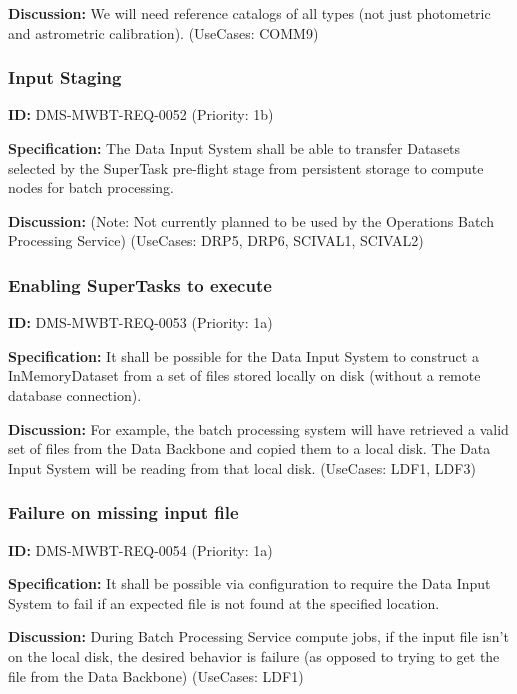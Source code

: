 \documentclass[SE,toc,lsstdraft]{lsstdoc}
\begin{document}
\textbf{Discussion:}
We will need reference catalogs of all types (not just photometric and astrometric calibration). (UseCases: COMM9)

\subsubsection{Input Staging}

\label{DMS-MWBT-REQ-0052}
\textbf{ID:} DMS-MWBT-REQ-0052 (Priority: 1b)

\textbf{Specification:}
The Data Input System shall be able to transfer Datasets selected by the SuperTask pre-flight stage from persistent storage to compute nodes for batch processing.

\textbf{Discussion:}
(Note: Not currently planned to be used by the Operations Batch Processing Service) (UseCases: DRP5, DRP6, SCIVAL1, SCIVAL2)

\subsubsection{Enabling SuperTasks to execute}

\label{DMS-MWBT-REQ-0053}
\textbf{ID:} DMS-MWBT-REQ-0053 (Priority: 1a)

\textbf{Specification:}
It shall be possible for the Data Input System to construct a InMemoryDataset from a set of files stored locally on disk (without a remote database connection).

\textbf{Discussion:}
For example, the batch processing system will have retrieved a valid set of files from the Data Backbone and copied them to a local disk. The Data Input System will be reading from that local disk. (UseCases: LDF1, LDF3)

\subsubsection{Failure on missing input file}

\label{DMS-MWBT-REQ-0054}
\textbf{ID:} DMS-MWBT-REQ-0054 (Priority: 1a)

\textbf{Specification:}
It shall be possible via configuration to require the Data Input System to fail if an expected file is not found at the specified location.

\textbf{Discussion:}
During Batch Processing Service compute jobs, if the input file isn't on the local disk, the desired behavior is failure (as opposed to trying to get the file from the Data Backbone) (UseCases: LDF1)
\end{document}
